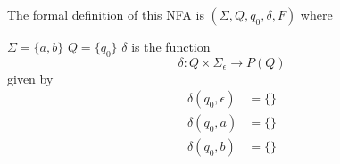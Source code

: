 The formal definition of this NFA is $(\Sigma, Q, q_0, \delta, F)$ where
\begin{tightlist}
\li $\Sigma = \{a,b\}$
\li $Q = \{q_0\}$
\li $\delta$ is the function
\[
\delta : Q \times \Sigma_\epsilon \rightarrow P(Q)
\]
given by
\begin{align*}
  \delta(q_0, \epsilon) &= \{\} \\
  \delta(q_0, a) &= \{\} \\
  \delta(q_0, b) &= \{\} 
\end{align*}
\end{tightlist}
